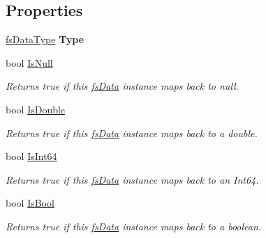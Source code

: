 \subsection*{Properties}
\begin{DoxyCompactItemize}
\item 
\mbox{\label{class_full_serializer_1_1fs_data_a1103886f8029af3fb3e9adef1685072a}} 
\hyperlink{namespace_full_serializer_a6eee33d63b94e40fdfcfc59af9fcfc82}{fs\+Data\+Type} {\bfseries Type}
\item 
bool \hyperlink{class_full_serializer_1_1fs_data_af434698e3ebdea70932122c1b326c0a8}{Is\+Null}
\begin{DoxyCompactList}\small\item\em Returns true if this \hyperlink{class_full_serializer_1_1fs_data}{fs\+Data} instance maps back to null. \end{DoxyCompactList}\item 
bool \hyperlink{class_full_serializer_1_1fs_data_a346ac35da58a28836daed508ecf32b3f}{Is\+Double}
\begin{DoxyCompactList}\small\item\em Returns true if this \hyperlink{class_full_serializer_1_1fs_data}{fs\+Data} instance maps back to a double. \end{DoxyCompactList}\item 
bool \hyperlink{class_full_serializer_1_1fs_data_a80a85a78dda84fe0c68f7a163355e8c1}{Is\+Int64}
\begin{DoxyCompactList}\small\item\em Returns true if this \hyperlink{class_full_serializer_1_1fs_data}{fs\+Data} instance maps back to an Int64. \end{DoxyCompactList}\item 
bool \hyperlink{class_full_serializer_1_1fs_data_a0150291174c11e0880aee949b14c8741}{Is\+Bool}
\begin{DoxyCompactList}\small\item\em Returns true if this \hyperlink{class_full_serializer_1_1fs_data}{fs\+Data} instance maps back to a boolean. \end{DoxyCompactList}\item 

\end{DoxyCompactItemize}
